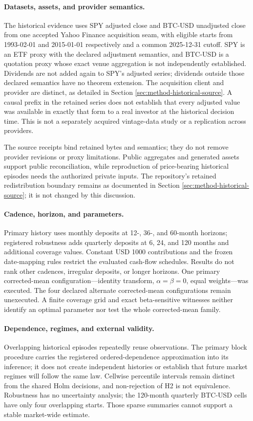 \documentclass[12pt,a4paper,oneside]{report}
\begin{document}
\paragraph{Datasets, assets, and provider semantics.}
The historical evidence uses SPY adjusted close and BTC-USD unadjusted close
from one accepted Yahoo Finance acquisition seam, with eligible starts from
1993-02-01 and 2015-01-01 respectively and a common 2025-12-31 cutoff. SPY
is an ETF proxy with the declared adjustment semantics, and BTC-USD is a
quotation proxy whose exact venue aggregation is not independently
established. Dividends are not added again to SPY's adjusted series; dividends
outside those declared semantics have no theorem extension. The acquisition
client and provider are distinct, as detailed in Section
\ref{sec:method-historical-source}. A causal prefix in the retained series
does not establish that every adjusted value was available in exactly that
form to a real investor at the historical decision time. This is not a
separately acquired vintage-data study or a replication across providers.

The source receipts bind retained bytes and semantics; they do not remove
provider revisions or proxy limitations. Public aggregates and generated
assets support public reconciliation, while reproduction of price-bearing
historical episodes needs the authorized private inputs. The repository's
retained redistribution boundary remains as documented in Section
\ref{sec:method-historical-source}; it is not changed by this discussion.

\paragraph{Cadence, horizon, and parameters.}
Primary history uses monthly deposits at 12-, 36-, and 60-month horizons;
registered robustness adds quarterly deposits at 6, 24, and 120 months and
additional coverage values. Constant USD 1000 contributions and the frozen
date-mapping rules restrict the evaluated cash-flow schedules. Results do not
rank other cadences, irregular deposits, or longer horizons. One primary
corrected-mean configuration---identity transform, $\alpha=\beta=0$, equal
weights---was executed. The four declared alternate corrected-mean
configurations remain unexecuted. A finite coverage grid and exact
beta-sensitive witnesses neither identify an optimal parameter nor test the
whole corrected-mean family.

\paragraph{Dependence, regimes, and external validity.}
Overlapping historical episodes repeatedly reuse observations. The primary
block procedure carries the registered ordered-dependence approximation into
its inference; it does not create independent histories or establish that
future market regimes will follow the same law. Cellwise percentile intervals
remain distinct from the shared Holm decisions, and non-rejection of H2 is
not equivalence. Robustness has no uncertainty analysis; the 120-month
quarterly BTC-USD cells have only four overlapping starts. Those sparse
summaries cannot support a stable market-wide estimate.
\end{document}
